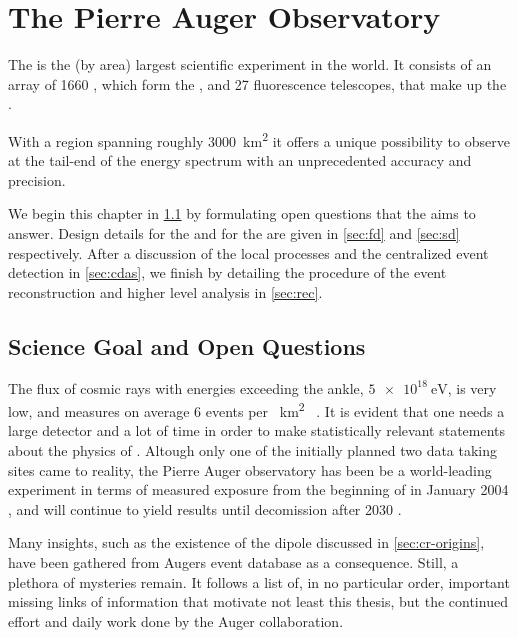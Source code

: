 
\chapter{The Pierre Auger Observatory}
\label{chap:pierre-auger-observatory}

The \PAO is the (by area) largest scientific experiment in the world. It 
consists of an array of 1660 \WCDs, which form the \SD, and 27 fluorescence 
telescopes, that make up the \FD.

With a region spanning roughly \SI{3000}{\kilo\meter\squared} it offers a unique
possibility to observe \UHECRs at the tail-end of the \CR energy spectrum with
an unprecedented accuracy and precision.

We begin this chapter in \cref{sec:science-case} by formulating open questions 
that the \PAO aims to answer. Design details for the \FD and for the \SD are 
given in \cref{sec:fd} and \cref{sec:sd} respectively. After a discussion of the
local \DAQ processes and the centralized event detection in \cref{sec:cdas}, we 
finish by detailing the procedure of the event reconstruction and higher level 
analysis in \cref{sec:rec}.

\section{Science Goal and Open Questions}
\label{sec:science-case}

The flux of cosmic rays with energies exceeding the ankle, $\SI{5e18}{\eV}$, is 
very low, and measures on average 6 events per \SI{}{\km\squared\year}
\cite{Fenu2023}. It is evident that one needs a large detector and a lot of time
in order to make statistically relevant statements about the physics of \UHECRs.
Altough only one of the initially planned two data taking sites \cite[for PAO 
white paper see][]{Zavrtanik2000} came to reality, the Pierre Auger observatory 
has been be a world-leading experiment in terms of measured exposure from the 
beginning of \DAQ in January 2004 \cite{Abraham2004}, and will continue to yield
results until decomission after 2030 \cite{Castellina2023}.

Many insights, such as the existence of the \CR dipole discussed in
\cref{sec:cr-origins}, have been gathered from Augers event database as a 
consequence. Still, a plethora of mysteries remain. It follows a list of, in no 
particular order, important missing links of information that motivate not least
this thesis, but the continued effort and daily work done by the Auger 
collaboration.


